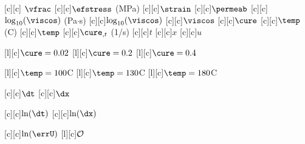 [c][c] {$\vfrac$}
[c][c]{$\efstress$ (MPa)}
[c][c]{$\strain$}
[c][c]{$\permeab$}
[c][c]{$\log_{10}(\viscos)$ (Pa$\cdot$s)}
[c][c]{$\log_{10}(\viscos)$}
[c][c]{$\viscos$}
[c][c]{$\cure$}
[c][c]{$\temp$ (\degree C)}
[c][c]{$\temp$}
[c][c]{$\cure_{,t}$ (1/s)}
[c][c]{$t$}
[c][c]{$x$}
[c][c]{$u$}

[l][c]{\hspace{-1.5em}\small$\cure=0.02$}
[l][c]{\hspace{-1.5em}\small$\cure=0.2$}
[l][c]{\hspace{-1.5em}\small$\cure=0.4$}

[l][c]{\hspace{-2.2em}\small$\temp=100$\degree C}
[l][c]{\hspace{-2.2em}\small$\temp=130$\degree C}
[l][c]{\hspace{-2.2em}\small$\temp=180$\degree C}

[c][c]{$\dt$}
[c][c]{$\dx$}

[c][c]{$\ln(\dt)$}
[c][c]{$\ln(\dx)$}

[c][c]{$\ln(\errU)$}
[l][c]{$\cal{O}$}
